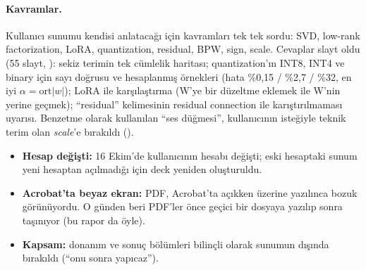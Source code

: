 \paragraph{Kavramlar.} Kullanıcı sunumu kendisi anlatacağı için kavramları tek tek sordu: SVD, low-rank factorization, LoRA, quantization, residual, BPW, sign, scale. Cevaplar slayt oldu (55 slayt, ): sekiz terimin tek cümlelik haritası; quantization'ın INT8, INT4 ve binary için sayı doğrusu ve hesaplanmış örnekleri (hata \%0,15 / \%2,7 / \%32, en iyi $\alpha = \text{ort}|w|$); LoRA ile karşılaştırma (W'ye bir düzeltme eklemek ile W'nin yerine geçmek); “residual” kelimesinin residual connection ile karıştırılmaması uyarısı. Benzetme olarak kullanılan “ses düğmesi”, kullanıcının isteğiyle teknik terim olan \emph{scale}'e bırakıldı ().

\sorunlar
\begin{itemize}
  \item \textbf{Hesap değişti:} 16 Ekim'de kullanıcının hesabı değişti; eski hesaptaki sunum yeni hesaptan açılmadığı için deck yeniden oluşturuldu.
  \item \textbf{Acrobat'ta beyaz ekran:} PDF, Acrobat'ta açıkken üzerine yazılınca bozuk görünüyordu. O günden beri PDF'ler önce geçici bir dosyaya yazılıp sonra taşınıyor (bu rapor da öyle).
  \item \textbf{Kapsam:} donanım ve sonuç bölümleri bilinçli olarak sunumun dışında bırakıldı (“onu sonra yapıcaz”).
\end{itemize}

